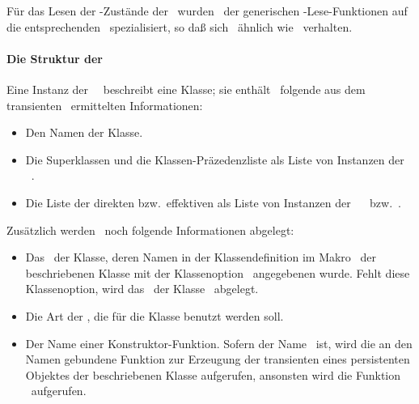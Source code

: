 %
F\"{u}r das Lesen der \Slt\/-Zust\"{a}nde der \deo[e]\ wurden
\mtd[n]\ der generischen \std-Lese-Funktionen auf die entsprechenden
\dec[n]\ spezialisiert, so da\ss{} sich \deo[e]\ \"{a}hn\-lich wie
\mo[e]\ verhalten.
%
\paragraph{Die Struktur der
\protect\clsdc\ \protect{}}
Eine Instanz der \clsdc\ \ beschreibt eine
Klasse; sie enth\"{a}lt \ua\ folgende aus dem transienten
\clsmo\ ermittelten Informationen:
\begin{itemize}
%
\item Den Namen der Klasse.
%
\item Die Superklassen und die Klassen-Pr\"{a}zedenzliste als Liste von
Instanzen der \clsdc\ .
%
\item Die Liste der direkten bzw.\ effektiven \Slt[s]\/ als Liste von
Instanzen der \sltdc[n]\ %
\ bzw.\ .
%
\end{itemize}
%
Zus\"{a}tzlich werden \ua\ noch folgende Informationen abgelegt:
%
\begin{itemize}
%
\item Das \clsdo\ der Klasse, deren Namen in der Klassendefinition im
Makro \ der beschriebenen Klasse mit der Klassenoption
\ angegebenen wurde. Fehlt diese Klassenoption, wird
das \clsdo\ der Klasse \ abgelegt.
%
\item Die Art der , die f\"{u}r
die Klasse benutzt werden soll.
%
\item Der Name einer Konstruktor-Funktion. Sofern der Name
\nonnil\ ist, wird die an den Namen gebundene Funktion zur Erzeugung
der transienten \representation{} eines persistenten Objektes der
beschriebenen Klasse aufgerufen, ansonsten wird die Funktion
\ aufgerufen.
%
\end{itemize}
%
